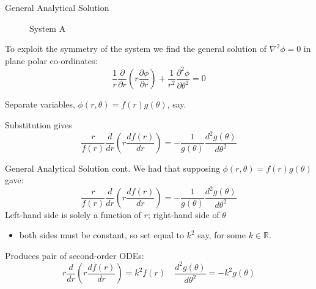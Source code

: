 \documentclass{beamer}
\newcommand{\be}{\begin{equation}}
\newcommand{\ee}{\end{equation}}
\begin{document}
\begin{frame}{General Analytical Solution}
\begin{figure}
\centering
	\caption{System A}
\end{figure}

To exploit the symmetry of the system we find the general solution of $\nabla^2 \phi=0$
in plane polar co-ordinates: 
%
\be
\frac{1}{r}\frac{\partial}{\partial r}(r \frac{\partial \phi}{\partial r}) + \frac{1}{r^2}\frac{\partial ^2 \phi}{\partial \theta^2} = 0 
\ee

\pause
Separate variables, $\phi(r,\theta)=f(r)g(\theta)$, say.

\pause
Substitution gives
%
\be
\frac{r}{f(r)}\frac{d}{dr}(r \frac{df(r)}{dr}) =- \frac{1}{g(\theta)}\frac{d^2 g(\theta)}{d \theta^2}
\ee

\end{frame}

\begin{frame}{General Analytical Solution cont.}
We had that supposing $\phi(r,\theta)=f(r)g(\theta)$ gave:
%
\be
\frac{r}{f(r)}\frac{d}{dr}(r \frac{df(r)}{dr}) =- \frac{1}{g(\theta)}\frac{d^2 g(\theta)}{d \theta^2}
\ee
%
\pause
Left-hand side is solely a function of $r$; right-hand side of $\theta$ 
\begin{itemize}
\pause
\item both sides must be constant, so set equal to $k^2$ say, for some $k \in \mathbb{R}$.
\end{itemize}

\pause
Produces pair of second-order ODEs:
%
\be
r\frac{d}{dr}(r \frac{df(r)}{dr}) = k^2 f(r) \quad \frac{d^2 g(\theta)}{d\theta^2} = -k^2 g(\theta)
\ee

\end{frame}
\end{document}
